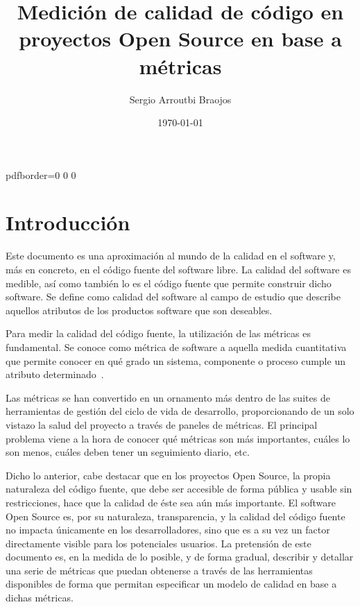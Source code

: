 \documentclass[11pt]{article}
\title{\textbf{Medición de calidad de código en proyectos Open Source en base a métricas}}
\author{Sergio Arroutbi Braojos}
\date{\today}
\begin{document}
\renewcommand{\listtablename}{Lista de Tablas}
\renewcommand{\tablename}{TABLA} 

\hypersetup
{   
pdfborder={0 0 0}
}
   
\maketitle

\pagebreak

\tableofcontents
\listoftables
\listoffigures

\pagebreak

\section{Introducción}

Este documento es una aproximación al mundo de la calidad en el software y, más en concreto, en el código fuente del software libre. La calidad del software es medible, así como también lo es el código fuente que permite construir dicho software. Se define como calidad del software al campo de estudio que describe aquellos atributos de los productos software que son deseables.

Para medir la calidad del código fuente, la utilización de las métricas es fundamental. Se conoce como métrica de software a aquella medida cuantitativa que permite conocer en qué grado un sistema, componente o proceso cumple un atributo determinado~\cite{ieeeglossary:softwareengineeringterminology}.

Las métricas se han convertido en un ornamento más dentro de las suites de herramientas de gestión del ciclo de vida de desarrollo, proporcionando de un solo vistazo la salud del proyecto a través de paneles de métricas.
El principal problema viene a la hora de conocer qué métricas son más importantes, cuáles lo son menos, cuáles deben tener un seguimiento diario, etc.~\cite{abistock:usingmetrics}

Dicho lo anterior, cabe destacar que en los proyectos Open Source, la propia naturaleza del código fuente, que debe ser accesible de forma pública y usable sin restricciones, hace que la calidad de éste sea aún más importante. El software Open Source es, por su naturaleza, transparencia, y la calidad del código fuente no impacta únicamente en los desarrolladores, sino que es a su vez un factor directamente visible para los potenciales usuarios.
La pretensión de este documento es, en la medida de lo posible, y de forma gradual, describir y detallar una serie de métricas que puedan obtenerse a través de las herramientas disponibles de forma que permitan especificar un modelo de calidad en base a dichas métricas.
\end{document}
